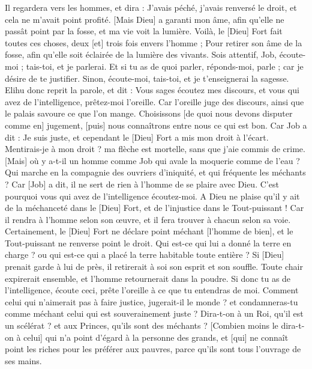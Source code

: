 \begin{multicols}{2}
Il regardera vers les hommes, et dira : J'avais péché, j'avais renversé le droit, et cela ne m'avait point profité.
[Mais Dieu] a garanti mon âme, afin qu'elle ne passât point par la fosse, et ma vie voit la lumière.
Voilà, le [Dieu] Fort fait toutes ces choses, deux [et] trois fois envers l'homme ;
Pour retirer son âme de la fosse, afin qu'elle soit éclairée de la lumière des vivants.
Sois attentif, Job, écoute-moi ; tais-toi, et je parlerai.
Et si tu as de quoi parler, réponds-moi, parle ; car je désire de te justifier.
Sinon, écoute-moi, tais-toi, et je t'enseignerai la sagesse.
\VerseOne{}Elihu donc reprit la parole, et dit :
Vous sages écoutez mes discours, et vous qui avez de l'intelligence, prêtez-moi l'oreille.
Car l'oreille juge des discours, ainsi que le palais savoure ce que l'on mange.
Choisissons [de quoi nous devons disputer comme en] jugement, [puis] nous connaîtrons entre nous ce qui est bon.
Car Job a dit : Je suis juste, et cependant le [Dieu] Fort a mis mon droit à l'écart.
Mentirais-je à mon droit ? ma flèche est mortelle, sans que j'aie commis de crime.
[Mais] où y a-t-il un homme comme Job qui avale la moquerie comme de l'eau ?
Qui marche en la compagnie des ouvriers d'iniquité, et qui fréquente les méchants ?
Car [Job] a dit, il ne sert de rien à l'homme de se plaire avec Dieu.
C'est pourquoi vous qui avez de l'intelligence écoutez-moi. A Dieu ne plaise qu'il y ait de la méchanceté dans le [Dieu] Fort, et de l'injustice dans le Tout-puissant !
Car il rendra à l'homme selon son œuvre, et il fera trouver à chacun selon sa voie.
Certainement, le [Dieu] Fort ne déclare point méchant [l'homme de bien], et le Tout-puissant ne renverse point le droit.
Qui est-ce qui lui a donné la terre en charge ? ou qui est-ce qui a placé la terre habitable toute entière ?
Si [Dieu] prenait garde à lui de près, il retirerait à soi son esprit et son souffle.
Toute chair expirerait ensemble, et l'homme retournerait dans la poudre.
Si donc tu as de l'intelligence, écoute ceci, prête l'oreille à ce que tu entendras de moi.
Comment celui qui n'aimerait pas à faire justice, jugerait-il le monde ? et condamneras-tu comme méchant celui qui est souverainement juste ?
Dira-t-on à un Roi, qu'il est un scélérat ? et aux Princes, qu'ils sont des méchants ?
[Combien moins le dira-t-on à celui] qui n'a point d'égard à la personne des grands, et [qui] ne connaît point les riches pour les préférer aux pauvres, parce qu'ils sont tous l'ouvrage de ses mains.

\end{multicols}
